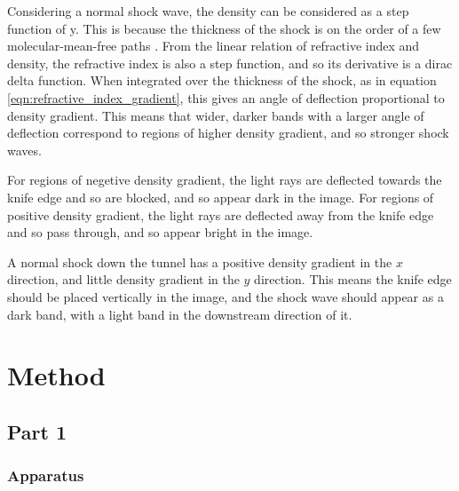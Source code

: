 \documentclass{article}
\begin{document}
Considering a normal shock wave, the density can be considered as a step function of y.
This is because the thickness of the shock is on the order of a few molecular-mean-free paths \cite{babinsky_delery:2011}.
From the linear relation of refractive index and density, the refractive index is also a step function, and so its derivative is a dirac delta function.
When integrated over the thickness of the shock, as in equation \ref{eqn:refractive_index_gradient}, this gives an angle of deflection proportional to density gradient.
This means that wider, darker bands with a larger angle of deflection correspond to regions of higher density gradient, and so stronger shock waves.

For regions of negetive density gradient, the light rays are deflected towards the knife edge and so are blocked, and so appear dark in the image.
For regions of positive density gradient, the light rays are deflected away from the knife edge and so pass through, and so appear bright in the image.

A normal shock down the tunnel has a positive density gradient in the $x$ direction, and little density gradient in the $y$ direction.
This means the knife edge should be placed vertically in the image, and the shock wave should appear as a dark band, with a light band in the downstream direction of it.

\section{Method}
\subsection{Part 1}
\subsubsection{Apparatus}
\end{document}
